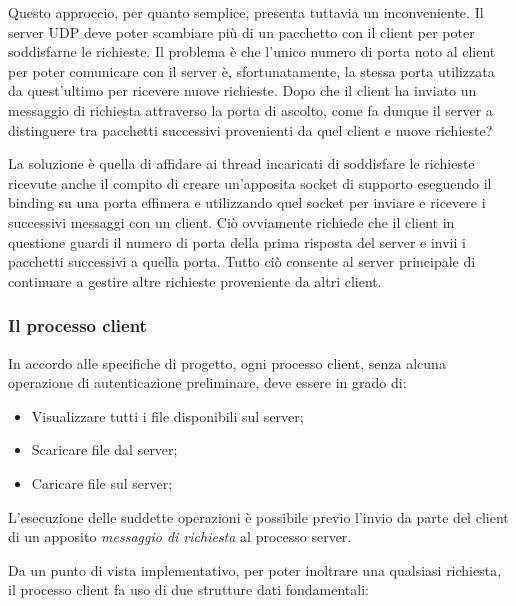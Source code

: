 \documentclass[10pt,a4paper, titlepage]{report}
\begin{document}
Questo approccio, per quanto semplice, presenta tuttavia un inconveniente. Il server UDP deve poter scambiare più di un pacchetto con il client per poter soddisfarne le richieste. Il problema è che l'unico numero di porta noto al client per poter comunicare con il server è, sfortunatamente, la stessa porta utilizzata da quest'ultimo per ricevere nuove richieste. Dopo che il client ha inviato un messaggio di richiesta attraverso la porta di ascolto, come fa dunque il server a distinguere tra pacchetti successivi provenienti da quel client e nuove richieste? 

La soluzione è quella di affidare ai thread incaricati di soddisfare le richieste ricevute anche il compito di creare un'apposita socket di supporto eseguendo il binding su una porta effimera e utilizzando quel socket per inviare e ricevere i successivi messaggi con un client. Ciò ovviamente richiede che il client in questione guardi il numero di porta della prima risposta del server e invii i pacchetti successivi a quella porta. Tutto ciò consente al server principale di continuare a gestire altre richieste proveniente da altri client. 

\subsubsection{Il processo client}

In accordo alle specifiche di progetto, ogni processo client, senza alcuna operazione di autenticazione preliminare, deve essere in grado di:
\begin{itemize}
\item Visualizzare tutti i file disponibili sul server;
\item Scaricare file dal server;
\item Caricare file sul server;
\end{itemize}
L'esecuzione  delle suddette operazioni è possibile previo l'invio da parte del client di un apposito \textit{messaggio di richiesta} al processo server.

Da un punto di vista implementativo, per poter inoltrare una qualsiasi richiesta, il processo client fa uso di due strutture dati fondamentali:
\end{document}
